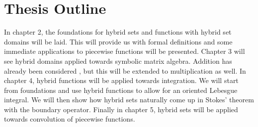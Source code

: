 \section{Thesis Outline}


In chapter 2, the foundations for hybrid sets and functions with hybrid set domains will be laid. 
This will provide us with formal definitions and some immediate applications to piecewise functions will be presented.
Chapter 3 will see hybrid domains applied towards symbolic matrix algebra.
Addition has already been considered \cite{carette2010}, but this will be extended to multiplication as well.
In chapter 4, hybrid functions will be applied towards integration. 
We will start from foundations and use hybrid functions to allow for an oriented Lebesgue integral.
We will then show how hybrid sets naturally come up in Stokes' theorem with the boundary operator.
Finally in chapter 5, hybrid sets will be applied towards convolution of piecewise functions.

















